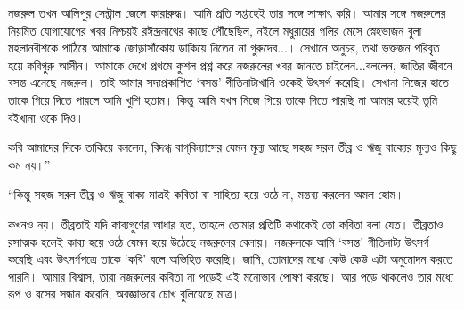 \documentclass[a4paper,11pt]{article}
\begin{document}
\begin{multicols}{2}{
\begin{spacing}{1.15}
\bn নজরুল তখন আলিপুর সেন্ট্রাল জেলে কারারুদ্ধ।  আমি প্রতি সপ্তাহেই তার সঙ্গে সাক্ষাৎ করি।  আমার সঙ্গে নজরুলের নিয়মিত যোগাযোগের খবর নিশ্চয়ই রঈন্দ্রনাথের কাছে পৌঁছেছিল, নইলে মধুরায়ের গলির মেসে স্নেহভাজন বুলা মহলানবীশকে পাঠিয়ে আমাকে জোড়াসাঁকোয় ডাকিয়ে নিতেন না গুরুদেব...।  সেখানে অনুচর, তথা ভক্তজন পরিবৃত হয়ে কবিগুরু আসীন।  আমাকে দেখে প্রথমে কুশল প্রশ্ন করে নজরুলের খবর জানতে চাইলেন...বললেন, জাতির জীবনে বসন্ত এনেছে নজরুল।  তাই আমার সদ্যপ্রকাশিত ‘বসন্ত’ গীতিনাট্যখানি ওকেই উৎসর্গ করেছি।  সেখানা নিজের হাতে তাকে গিয়ে দিতে পারলে আমি খুশি হতাম।  কিন্তু আমি যখন নিজে গিয়ে তাকে দিতে পারছি না আমার হয়েই তুমি বইখানা ওকে দিও।

কবি আমাদের দিকে তাকিয়ে বললেন, বিদগ্ধ বাগ্‌বিন্যাসের যেমন মূল্য আছে সহজ সরল তীব্র ও ঋজু বাক্যের মূল্যও কিছু কম নয়।”


“কিন্তু সহজ সরল তীব্র ও ঋজু বাক্য মাত্রই কবিতা বা সাহিত্য হয়ে ওঠে না, মন্তব্য করলেন অমল হোম।

কখনও নয়।  তীব্রতাই যদি কাব্যগুণের আধার হত, তাহলে তোমার প্রতিটি কথাকেই তো কবিতা বলা যেত।  তীব্রতাও রসাত্মক হলেই কাব্য হয়ে ওঠে যেমন হয়ে উঠেছে নজরুলের বেলায়।  নজরুলকে আমি ‘বসন্ত’ গীতিনাট্য উৎসর্গ করেছি এবং উৎসর্গপত্রে তাকে ‘কবি’ বলে অভিহিত করেছি।  জানি, তোমাদের মধ্যে কেউ কেউ এটা অনুমোদন করতে পারনি।  আমার বিশ্বাস, তারা নজরুলের কবিতা না পড়েই এই মনোভাব পোষণ করছে।  আর পড়ে থাকলেও তার মধ্যে রূপ ও রসের সন্ধান করেনি, অবজ্ঞাভরে চোখ বুলিয়েছে মাত্র।


\end{spacing}}
\end{multicols}
\end{document}
